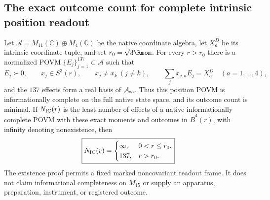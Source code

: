 \documentclass[12pt,a4paper]{article}
\begin{document}
\subsection{The exact outcome count for complete intrinsic position readout}
\label{p2c:sec:v258-minimal-complete-readout}

\begin{theorem}
\label{p2c:thm:v258-minimal-complete-readout}
Let $\mathcal A=M_{11}(\mathbb C)\oplus M_4(\mathbb C)$ be the native
coordinate algebra, let $X_a^D$ be its intrinsic coordinate tuple, and set
$r_0=\sqrt3\Rmom$. For every $r>r_0$ there is a normalized POVM
$\{E_j\}_{j=1}^{137}\subset\mathcal A$ such that
\[
 E_j\succ0,\qquad x_j\in S^3(r),\qquad x_j\ne x_k\ (j\ne k),
 \qquad \sum_jx_{j,a}E_j=X_a^D\quad(a=1,\ldots,4),
\]
and the $137$ effects form a real basis of $\mathcal A_{\rm sa}$.
Thus this position POVM is informationally complete on the full native
state space, and its outcome count is minimal. If $N_{\rm IC}(r)$ is the
least number of effects of a native informationally complete POVM with
these exact moments and outcomes in $\overline B^4(r)$, with infinity
denoting nonexistence, then
\begin{equation}
 \boxed{
 N_{\rm IC}(r)=
 \begin{cases}
  \infty,&0<r\le r_0,\\
  137,&r>r_0.
 \end{cases}}
 \label{p2c:eq:v258-exact-ic-count}
\end{equation}
The existence proof permits a fixed marked noncovariant readout frame.
It does not claim informational completeness on $M_{15}$ or supply an
apparatus, preparation, instrument, or registered outcome.
\end{theorem}
\end{document}
